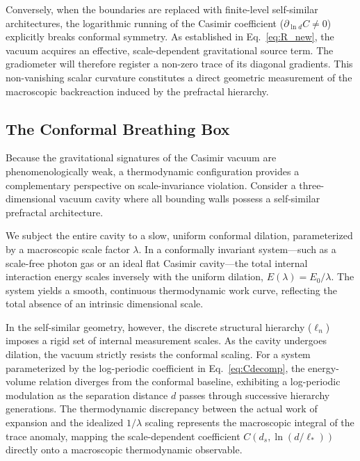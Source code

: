 \documentclass[12pt,letterpaper]{article}
\begin{document}
Conversely, when the boundaries are replaced with finite-level self-similar architectures, the logarithmic running of the Casimir coefficient ($\partial_{\ln d}C \neq 0$) explicitly breaks conformal symmetry. As established in Eq.~\eqref{eq:R_new}, the vacuum acquires an effective, scale-dependent gravitational source term. The gradiometer will therefore register a non-zero trace of its diagonal gradients. This non-vanishing scalar curvature constitutes a direct geometric measurement of the macroscopic backreaction induced by the prefractal hierarchy.

\subsection{The Conformal Breathing Box}

Because the gravitational signatures of the Casimir vacuum are phenomenologically weak, a thermodynamic configuration provides a complementary perspective on scale-invariance violation. Consider a three-dimensional vacuum cavity where all bounding walls possess a self-similar prefractal architecture. 

We subject the entire cavity to a slow, uniform conformal dilation, parameterized by a macroscopic scale factor $\lambda$. In a conformally invariant system---such as a scale-free photon gas or an ideal flat Casimir cavity---the total internal interaction energy scales inversely with the uniform dilation, $E(\lambda) = E_0/\lambda$. The system yields a smooth, continuous thermodynamic work curve, reflecting the total absence of an intrinsic dimensional scale.

In the self-similar geometry, however, the discrete structural hierarchy ($\ell_n$) imposes a rigid set of internal measurement scales. As the cavity undergoes dilation, the vacuum strictly resists the conformal scaling. For a system parameterized by the log-periodic coefficient in Eq.~\eqref{eq:Cdecomp}, the energy-volume relation diverges from the conformal baseline, exhibiting a log-periodic modulation as the separation distance $d$ passes through successive hierarchy generations. The thermodynamic discrepancy between the actual work of expansion and the idealized $1/\lambda$ scaling represents the macroscopic integral of the trace anomaly, mapping the scale-dependent coefficient $C(d_s, \ln(d/\ell_*))$ directly onto a macroscopic thermodynamic observable.
\end{document}
